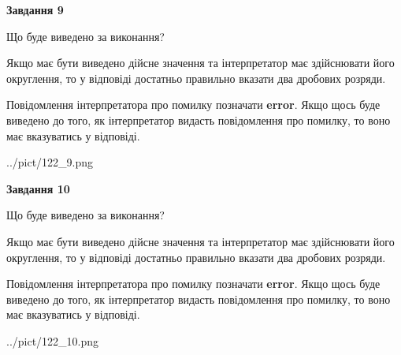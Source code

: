 \documentclass[12pt, ukrainian]{article}
\begin{document}
{\begin {Large}
{\begin {center}\textbf{Завдання 9}\end {center}}\par
Що буде виведено за виконання? \par

Якщо має бути виведено дійсне значення та інтерпретатор має здійснювати його округлення, 
то у відповіді достатньо правильно вказати два дробових розряди.

Повідомлення інтерпретатора про помилку позначати \textbf{error}.
Якщо щось буде виведено до того, як інтерпретатор видасть повідомлення про помилку, 
то воно має вказуватись у відповіді. \par

\begin{center}
	{../pict/122_9.png}
\end{center}
\newpage

{\begin {center}\textbf{Завдання 10}\end {center}}\par
Що буде виведено за виконання? \par

Якщо має бути виведено дійсне значення та інтерпретатор має здійснювати його округлення, 
то у відповіді достатньо правильно вказати два дробових розряди.

Повідомлення інтерпретатора про помилку позначати \textbf{error}.
Якщо щось буде виведено до того, як інтерпретатор видасть повідомлення про помилку, 
то воно має вказуватись у відповіді. \par

\begin{center}
	{../pict/122_10.png}
\end{center}
\newpage

\end {Large}}
\end{document}
